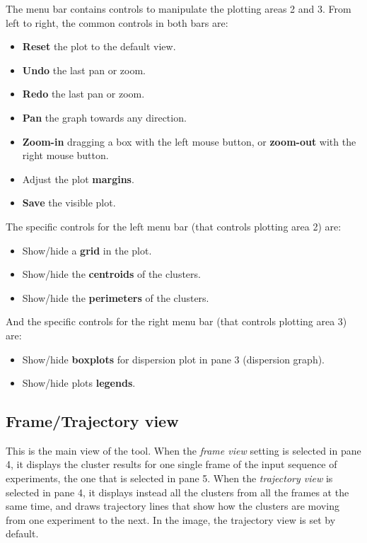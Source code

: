 \documentclass[twoside,a4,english,11pt]{book}
\begin{document}
The menu bar contains controls to manipulate the plotting areas 2 and 3. From left to right, the common controls 
in both bars are:

\begin{itemize}
 \item \textbf{Reset} the plot to the default view.
 \item \textbf{Undo} the last pan or zoom.
 \item \textbf{Redo} the last pan or zoom.
 \item \textbf{Pan} the graph towards any direction.
 \item \textbf{Zoom-in} dragging a box with the left mouse button, or \textbf{zoom-out} with the right mouse button.
 \item Adjust the plot \textbf{margins}.
 \item \textbf{Save} the visible plot.
\end{itemize}

The specific controls for the left menu bar (that controls plotting area 2) are:

\begin{itemize}
 \item Show/hide a \textbf{grid} in the plot.
 \item Show/hide the \textbf{centroids} of the clusters.
 \item Show/hide the \textbf{perimeters} of the clusters.
\end{itemize}

And the specific controls for the right menu bar (that controls plotting area 3) are:

\begin{itemize}
 \item Show/hide \textbf{boxplots} for dispersion plot in pane 3 (dispersion graph).
 \item Show/hide plots \textbf{legends}.
\end{itemize}


\subsection{Frame/Trajectory view}

This is the main view of the tool. When the \emph{frame view} setting is selected in pane 4, it displays the cluster results 
for one single frame of the input sequence of experiments, the one that is selected in pane 5. When the \emph{trajectory view}
is selected in pane 4, it displays instead all the clusters from all the frames at the same time, and draws trajectory lines
that show how the clusters are moving from one experiment to the next. In the image, the trajectory view is set by default.
\end{document}
